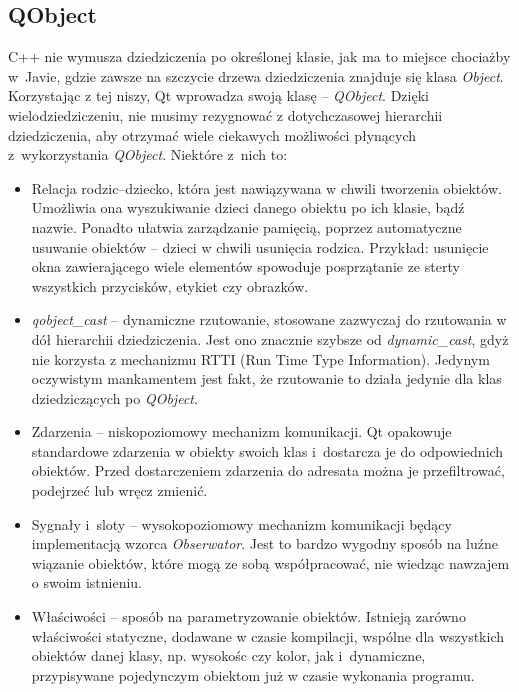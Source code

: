\subsection{QObject}
C++ nie wymusza dziedziczenia po określonej klasie, jak ma to miejsce chociażby w~Javie, gdzie zawsze na szczycie drzewa dziedziczenia znajduje się klasa \textit{Object}. Korzystając z tej niszy, Qt wprowadza swoją klasę -- \textit{QObject}. Dzięki wielodziedziczeniu, nie musimy rezygnować z dotychczasowej hierarchii dziedziczenia, aby otrzymać wiele ciekawych możliwości płynących z~wykorzystania \textit{QObject}.
Niektóre z~nich to:
\begin{itemize}
\item Relacja rodzic--dziecko, która jest nawiązywana w chwili tworzenia obiektów. Umożliwia ona wyszukiwanie dzieci danego obiektu po ich klasie, bądź nazwie. Ponadto ułatwia zarządzanie pamięcią, poprzez automatyczne usuwanie obiektów -- dzieci w chwili usunięcia rodzica. Przykład: usunięcie okna zawierającego wiele elementów spowoduje posprzątanie ze sterty wszystkich przycisków, etykiet czy obrazków.
\item \textit{qobject\_cast} -- dynamiczne rzutowanie, stosowane zazwyczaj do rzutowania w dół hierarchii dziedziczenia. Jest ono znacznie szybsze od \textit{dynamic\_cast}, gdyż nie korzysta z mechanizmu RTTI (Run Time Type Information). Jedynym oczywistym mankamentem jest fakt, że rzutowanie to działa jedynie dla klas dziedziczących po \textit{QObject}.
\item Zdarzenia -- niskopoziomowy mechanizm komunikacji. Qt opakowuje standardowe zdarzenia w obiekty swoich klas i~dostarcza je do odpowiednich obiektów. Przed dostarczeniem zdarzenia do adresata można je przefiltrować, podejrzeć lub wręcz zmienić.
\item Sygnały i~sloty -- wysokopoziomowy mechanizm komunikacji będący implementacją wzorca \textit{Obserwator}.
Jest to bardzo wygodny sposób na luźne wiązanie obiektów, które mogą ze sobą współpracować, nie wiedząc nawzajem o swoim istnieniu.
\item Właściwości -- sposób na parametryzowanie obiektów. Istnieją zarówno właściwości statyczne, dodawane w czasie kompilacji, wspólne dla wszystkich obiektów danej klasy, np. wysokośc czy kolor, jak i~dynamiczne, przypisywane pojedynczym obiektom już w czasie wykonania programu.
\end{itemize}

